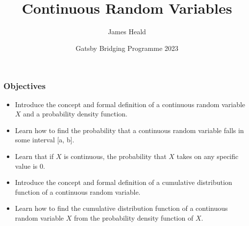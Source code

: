 \documentclass[9pt]{beamer}
\title[Continuous Random Variables ]
{Continuous Random Variables\newline }
\subtitle{}
\author[James Heald] %
{James Heald\inst{1}}
\institute[UCL] %
{
  \inst{1}%
  Gatsby Computational Neuroscience Unit\\
  University College London
}
\date[Gatsby Bridging Programme  2023] %
{Gatsby Bridging Programme 2023}
\begin{document}
\frame{\titlepage}



\begin{frame}
\frametitle{Objectives}
\begin{itemize}
    \item Introduce the concept and formal definition of a continuous random variable $X$ and a probability density function.
        \item Learn how to find the probability that a continuous random variable falls in some interval [a, b].
    \item Learn that if $X$ is continuous, the probability that $X$ takes on any specific value is 0.
    \item Introduce the concept and formal definition of a cumulative distribution function of a continuous random variable.
    \item Learn how to find the cumulative distribution function of a continuous random variable $X$ from the probability density function of $X$.
\end{itemize}
\end{frame}
\end{document}
